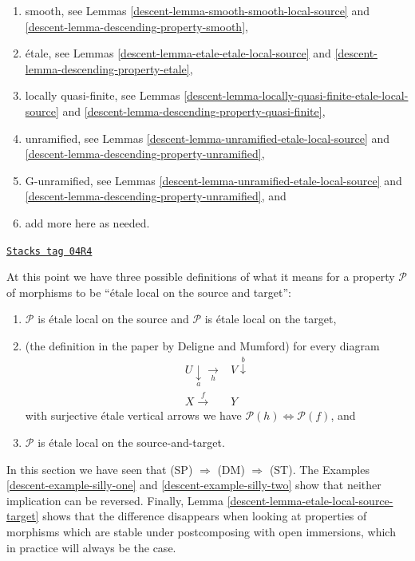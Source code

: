\begin{remark}
\begin{enumerate}
Lemmas \ref{descent-lemma-syntomic-syntomic-local-source} and
\ref{descent-lemma-descending-property-syntomic},
\item smooth, see
Lemmas \ref{descent-lemma-smooth-smooth-local-source} and
\ref{descent-lemma-descending-property-smooth},
\item \'etale, see
Lemmas \ref{descent-lemma-etale-etale-local-source} and
\ref{descent-lemma-descending-property-etale},
\item locally quasi-finite, see
Lemmas \ref{descent-lemma-locally-quasi-finite-etale-local-source} and
\ref{descent-lemma-descending-property-quasi-finite},
\item unramified, see
Lemmas \ref{descent-lemma-unramified-etale-local-source} and
\ref{descent-lemma-descending-property-unramified},
\item G-unramified, see
Lemmas \ref{descent-lemma-unramified-etale-local-source} and
\ref{descent-lemma-descending-property-unramified}, and
\item add more here as needed.
\end{enumerate}
\end{remark}

\begin{remark}
\label{descent-remark-compare-definitions}
\href{https://stacks.math.columbia.edu/tag/04R4}{\texttt{Stacks tag 04R4}}

At this point we have three possible definitions of what it means for a
property $\mathcal{P}$ of morphisms to be ``\'etale local on the source and
target'':
\begin{enumerate}
\item[(ST)] $\mathcal{P}$ is \'etale local on the source and $\mathcal{P}$ is
\'etale local on the target,
\item[(DM)] (the definition in the paper \cite[Page 100]{DM} by
Deligne and Mumford) for every diagram
$$
\begin{array}{cc}U \underset{a}{\downarrow}\underset{h}{\longrightarrow} & V \overset{b}{\downarrow} \\ X \overset{f}{\longrightarrow} & Y\end{array}
$$
with surjective \'etale vertical arrows we have
$\mathcal{P}(h) \Leftrightarrow \mathcal{P}(f)$, and
\item[(SP)] $\mathcal{P}$ is \'etale local on the source-and-target.
\end{enumerate}
In this section we have seen that (SP) $\Rightarrow$ (DM) $\Rightarrow$ (ST).
The
Examples \ref{descent-example-silly-one} and \ref{descent-example-silly-two}
show that neither implication can be reversed. Finally,
Lemma \ref{descent-lemma-etale-local-source-target}
shows that the difference disappears when looking at properties of
morphisms which are stable under postcomposing with open immersions, which
in practice will always be the case.
\end{remark}

